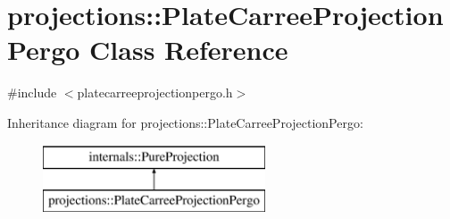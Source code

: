 \hypertarget{classprojections_1_1_plate_carree_projection_pergo}{\section{projections\-:\-:\-Plate\-Carree\-Projection\-Pergo \-Class \-Reference}
\label{classprojections_1_1_plate_carree_projection_pergo}
}


{\ttfamily \#include $<$platecarreeprojectionpergo.\-h$>$}

\-Inheritance diagram for projections\-:\-:\-Plate\-Carree\-Projection\-Pergo\-:\begin{figure}[H]
\begin{center}
\leavevmode
\includegraphics[height=2.000000cm]{classprojections_1_1_plate_carree_projection_pergo}
\end{center}
\end{figure}
